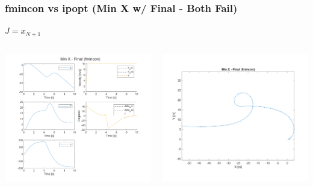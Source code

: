 \documentclass[aspectratio=169]{beamer}
\begin{document}
\begin{frame}
	\frametitle{fmincon vs ipopt (Min X w/ Final - Both Fail)}
	$J = x_{N+1}$
	\begin{columns}
		\begin{column}{0.4\textwidth}
			\includegraphics[width = \columnwidth]{figs/Min_X_-_Final_(fmincon)_traj.png}
		\end{column}
		\begin{column}{0.25\textwidth}
			\includegraphics[width = \columnwidth]{figs/Min_X_-_Final_(fmincon)_quiver.png}

\end{column}
\end{columns}
\end{frame}
\end{document}
